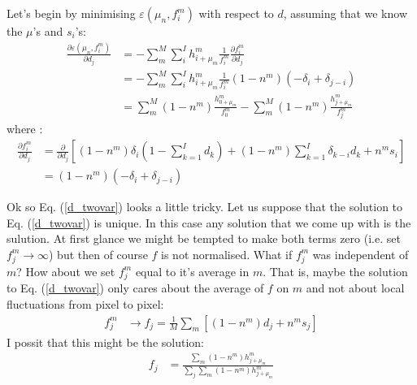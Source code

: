 \documentclass[11pt]{article}
\begin{document}
Let's begin by minimising $\varepsilon(\mu_n, f^m_i)$ with respect to $d$, assuming that we know the $\mu$'s and $s_i$'s:
\begin{align}
   \frac{\partial \varepsilon(\mu_n, f^m_i)}{\partial d_j} &= -\sum_m^M \sum_i^I h^m_{i+\mu_m} \frac{1}{f^m_i} \frac{\partial f^m_i}{\partial d_j} \\
   &= -\sum_m^M \sum_i^I h^m_{i+\mu_m} \frac{1}{f^m_i}(1-n^m)(-\delta_{i} + \delta_{j-i}) \\
   &= \sum_m^M (1-n^m) \frac{ h^m_{0+\mu_m}}{f^m_0}-\sum_m^M (1-n^m) \frac{ h^m_{j+\mu_m}}{f^m_j} 
   \label{d_twovar}
\end{align}
where :
\begin{align}
   \frac{\partial f^m_i}{\partial d_j} &= \frac{\partial }{\partial d_j} \left[ (1-n^m)\delta_{i} (1 - \sum_{k=1}^I d_k) + (1-n^m)\sum_{k=1}^I \delta_{k-i} d_k + n^m s_i\right] \\
   &= (1-n^m)(-\delta_{i} + \delta_{j-i})
\end{align}

Ok so Eq. (\ref{d_twovar}) looks a little tricky. Let us suppose that the solution to Eq. (\ref{d_twovar}) is unique. In this case any solution that we come up with is the sulution. At first glance we might be tempted to make both terms zero (i.e. set $f^m_j \rightarrow \infty$) but then of course $f$ is not normalised. What if $f^m_j$ was independent of $m$? How about we set $f^m_j$ equal to it's average in $m$. That is, maybe the solution to Eq. (\ref{d_twovar}) only cares about the average of $f$ on $m$ and not about local fluctuations from pixel to pixel:
\begin{align}
   f^m_j &\rightarrow f_j = \frac{1}{M}\sum_m \left[ (1-n^m)d_j + n^m s_j \right] 
\end{align}
I possit that this might be the solution:
\begin{align}
   f_j &= \frac{\sum_m (1-n^m)h^m_{j+\mu_m}}{\sum_{j}\sum_m (1-n^m) h^m_{j+\mu_m}}
\end{align}
\end{document}
